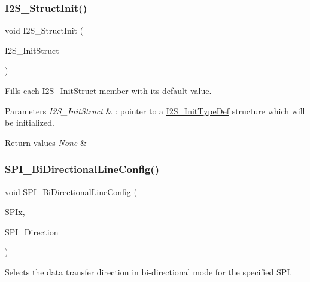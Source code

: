 \subsubsection{\texorpdfstring{I2S\_StructInit()}{I2S\_StructInit()}}
{\footnotesize\ttfamily void I2\+S\+\_\+\+Struct\+Init (\begin{DoxyParamCaption}\item[{\mbox{\hyperlink{struct_i2_s___init_type_def}{I2\+S\+\_\+\+Init\+Type\+Def}} $\ast$}]{I2\+S\+\_\+\+Init\+Struct }\end{DoxyParamCaption})}



Fills each I2\+S\+\_\+\+Init\+Struct member with its default value. 


\begin{DoxyParams}{Parameters}
{\em I2\+S\+\_\+\+Init\+Struct} & \+: pointer to a \mbox{\hyperlink{struct_i2_s___init_type_def}{I2\+S\+\_\+\+Init\+Type\+Def}} structure which will be initialized. \\
\hline
\end{DoxyParams}

\begin{DoxyRetVals}{Return values}
{\em None} & \\
\hline
\end{DoxyRetVals}
\mbox{\label{group___s_p_i___private___functions_ga166171c421fc51da7714723524d41b45}} 
\subsubsection{\texorpdfstring{SPI\_BiDirectionalLineConfig()}{SPI\_BiDirectionalLineConfig()}}
{\footnotesize\ttfamily void S\+P\+I\+\_\+\+Bi\+Directional\+Line\+Config (\begin{DoxyParamCaption}\item[{\mbox{\hyperlink{struct_s_p_i___type_def}{S\+P\+I\+\_\+\+Type\+Def}} $\ast$}]{S\+P\+Ix,  }\item[{uint16\+\_\+t}]{S\+P\+I\+\_\+\+Direction }\end{DoxyParamCaption})}



Selects the data transfer direction in bi-\/directional mode for the specified S\+PI. 


